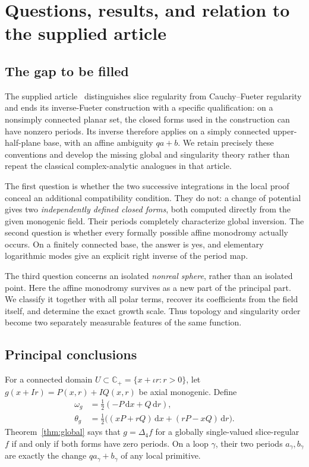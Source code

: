 \documentclass[11pt,a4paper]{article}
\numberwithin{equation}{section}
\theoremstyle{definition}
\theoremstyle{remark}
\newcommand{\C}{\mathbb C}
\newcommand{\Cp}{\C_+}
\newcommand{\Lap}{\Delta_4}
\newcommand{\dd}{\,\mathrm d}
\begin{document}
\section{Questions, results, and relation to the supplied article}
\label{sec:intro}

\subsection{The gap to be filled}
The supplied article~\cite{Supplied} distinguishes slice regularity from
Cauchy--Fueter regularity and ends its inverse-Fueter construction with a
specific qualification: on a nonsimply connected planar set, the closed
forms used in the construction can have nonzero periods. Its inverse
therefore applies on a simply connected upper-half-plane base, with an
affine ambiguity $qa+b$. We retain precisely these conventions and develop
the missing global and singularity theory rather than repeat the classical
complex-analytic analogues in that article.

The first question is whether the two successive integrations in the
local proof conceal an additional compatibility condition. They do not:
a change of potential gives two \emph{independently defined closed forms},
both computed directly from the given monogenic field. Their periods
completely characterize global inversion. The second question is whether
every formally possible affine monodromy actually occurs. On a finitely
connected base, the answer is yes, and elementary logarithmic modes give
an explicit right inverse of the period map.

The third question concerns an isolated \emph{nonreal sphere}, rather than
an isolated point. Here the affine monodromy survives as a new part of the
principal part. We classify it together with all polar terms, recover its
coefficients from the field itself, and determine the exact growth scale.
Thus topology and singularity order become two separately measurable
features of the same function.

\subsection{Principal conclusions}
For a connected domain $U\subset\Cp=\{x+\iota r:r>0\}$, let
$g(x+Ir)=P(x,r)+IQ(x,r)$ be axial monogenic. Define
\begin{align}
 \omega_g&=\frac12(-P\dd x+Q\dd r),\label{eq:intro-omega}\\
 \theta_g&=\frac12\bigl((xP+rQ)\dd x+(rP-xQ)\dd r\bigr).
 \label{eq:intro-theta}
\end{align}
Theorem~\ref{thm:global} says that $g=\Lap f$ for a globally single-valued
slice-regular $f$ if and only if both forms have zero periods. On a loop
$\gamma$, their two periods $a_\gamma,b_\gamma$ are exactly the change
$qa_\gamma+b_\gamma$ of any local primitive.
\end{document}
